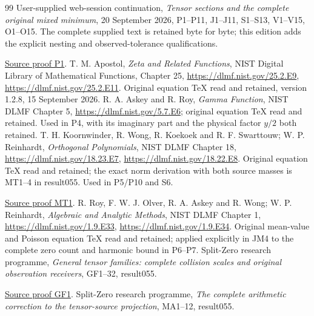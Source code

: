 \documentclass[11pt]{article}
\begin{document}
\begin{thebibliography}{99}
 User-supplied web-session continuation,
\emph{Tensor sections and the complete original mixed minimum},
20 September 2026, P1--P11, J1--J11, S1--S13, V1--V15, O1--O15.
The complete supplied text is retained byte for byte; this edition
adds the explicit nesting and observed-tolerance qualifications.

\href{https://github.com/KokunoYumeto/zeta-function-research-reader/blob/main/workbenches/splitzero-tandem/continuations/20260921-kernel-degree-steps/providers/SUPPLIED_PROOF_INTEGRATED.tex\#L49}{Source proof P1}.
 T. M. Apostol, \emph{Zeta and Related Functions},
NIST Digital Library of Mathematical Functions, Chapter 25,
\url{https://dlmf.nist.gov/25.2.E9},
\url{https://dlmf.nist.gov/25.2.E11}. Original equation TeX read
and retained, version 1.2.8, 15 September 2026.
 R. A. Askey and R. Roy, \emph{Gamma Function},
NIST DLMF Chapter 5, \url{https://dlmf.nist.gov/5.7.E6};
original equation TeX read and retained. Used in P4, with its
imaginary part and the physical factor $y/2$ both retained.
 T. H. Koornwinder, R. Wong, R. Koekoek and
R. F. Swarttouw; W. P. Reinhardt, \emph{Orthogonal Polynomials},
NIST DLMF Chapter 18,
\url{https://dlmf.nist.gov/18.23.E7},
\url{https://dlmf.nist.gov/18.22.E8}. Original equation TeX read
and retained; the exact norm derivation with both source masses is
MT1--4 in result055. Used in P5/P10 and S6.

\href{https://github.com/KokunoYumeto/zeta-function-research-reader/blob/main/workbenches/splitzero-tandem/continuations/20260921-kernel-degree-steps/providers/OBSERVATION_COMPLETE_PROOFS.tex\#L1629}{Source proof MT1}.
 R. Roy, F. W. J. Olver, R. A. Askey and R. Wong;
W. P. Reinhardt, \emph{Algebraic and Analytic Methods}, NIST DLMF
Chapter 1, \url{https://dlmf.nist.gov/1.9.E33},
\url{https://dlmf.nist.gov/1.9.E34}. Original mean-value and
Poisson equation TeX read and retained; applied explicitly in JM4
to the complete zero count and harmonic bound in P6--P7.
 Split-Zero research programme,
\emph{General tensor families: complete collision scales and
original observation receivers}, GF1--32, result055.

\href{https://github.com/KokunoYumeto/zeta-function-research-reader/blob/main/workbenches/splitzero-tandem/continuations/20260921-kernel-degree-steps/providers/OBSERVATION_COMPLETE_PROOFS.tex\#L1108}{Source proof GF1}.
 Split-Zero research programme,
\emph{The complete arithmetic correction to the tensor-source
projection}, MA1--12, result055.


\end{thebibliography}
\end{document}
